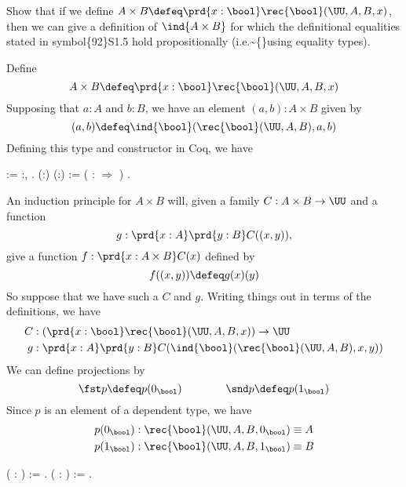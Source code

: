 Show that if we define $A \times B \defeq \prd{x : \bool}
\rec{\bool}(\UU, A, B, x)$, then we can give a definition of $\ind{A \times
  B}$ for which the definitional equalities stated in symbol\{92\}S1.5 hold
propositionally (i.e.\~{}\{\}using equality types). \begin{coqdoccode}
\coqdocemptyline
\end{coqdoccode}
\soln 
Define
\[
  A \times B \defeq \prd{x : \bool} \rec{\bool}(\UU, A, B, x)
\]
Supposing that $a : A$ and $b : B$, we have an element $(a, b) : A \times B$
given by
\[
  (a, b) \defeq \ind{\bool}(\rec{\bool}(\UU, A, B), a, b)
\]
Defining this type and constructor in Coq, we have \begin{coqdoccode}
\coqdocemptyline
\coqdocnoindent
{}  := \coqdockw{\ensuremath{\forall}} :,      .\coqdoceol
\coqdocemptyline
\coqdocnoindent
{}  (:) (:) :=  ( : \ensuremath{\Rightarrow}      )  .\coqdoceol
\coqdocemptyline
\end{coqdoccode}


An induction principle for $A \times B$ will, given a family $C : A \times B
\to \UU$ and a function 
\[
  g : \prd{x:A}\prd{y:B} C((x, y)),
\] 
give a function $f : \prd{x : A \times B}C(x)$ defined by
\[
  f((x, y)) \defeq g(x)(y)
\]
So suppose that we have such a $C$ and $g$.  Writing things out in terms of the
definitions, we have
\begin{align*}
  C &: \left(\prd{x:\bool}\rec{\bool}(\UU, A, B, x)\right) \to \UU \\
  g &: \prd{x:A}\prd{y:B} C(\ind{\bool}(\rec{\bool}(\UU, A, B), x, y))
\end{align*}  
We can define projections by
\[
  \fst p \defeq p(0_{\bool}) \qquad\qquad \snd p \defeq p(1_{\bool})
\]
Since $p$ is an element of a dependent type, we have
\begin{align*}
  p(0_{\bool}) &: \rec{\bool}(\UU, A, B, 0_{\bool}) \equiv A\\
  p(1_{\bool}) &: \rec{\bool}(\UU, A, B, 1_{\bool}) \equiv B
\end{align*} \begin{coqdoccode}
\coqdocemptyline
\coqdocnoindent
{}  ( : ) :=  .\coqdoceol
\coqdocemptyline
\coqdocnoindent
{}  ( : ) :=  .\coqdoceol
\coqdocemptyline
\end{coqdoccode}


